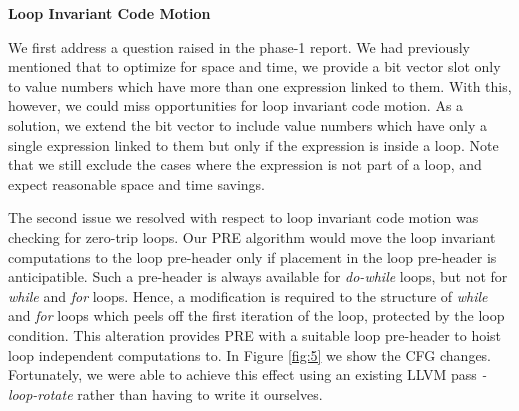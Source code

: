 \documentclass[10pt,twoside]{report}
\begin{document}
\begin{flushleft}
\textbf{\Large{Loop Invariant Code Motion}}
\end{flushleft}
We first address a question raised in the phase-1 report. We had previously
mentioned that to optimize for space and time, we provide a bit vector slot only to
value numbers which have more than one expression linked to them. With this,
      however, we could miss opportunities for loop invariant code motion. As a
      solution, we extend the bit vector to include value numbers which have
      only a single expression linked to them but only if the expression is
      inside a loop. Note that we still exclude the cases where the expression
      is not part of a loop, and expect reasonable space and time savings.  

      The second issue we resolved with respect to loop invariant code motion was 
      checking for zero-trip loops. Our PRE algorithm would move the loop invariant
      computations to the loop pre-header only if placement in the loop pre-header is 
      anticipatible. Such a pre-header is always available for \emph{do-while} loops, 
      but not for \emph{while} and \emph{for} loops. Hence, a modification is required
      to the structure of \emph{while} and \emph{for} loops which peels off the first
      iteration of the loop, protected by the loop condition. This alteration provides 
      PRE with a suitable loop pre-header to hoist loop independent computations to.
      In Figure \ref{fig:5} we show the CFG changes. Fortunately, we were able to 
      achieve this effect using an existing LLVM pass \emph{-loop-rotate} rather than
      having to write it ourselves.
\end{document}
